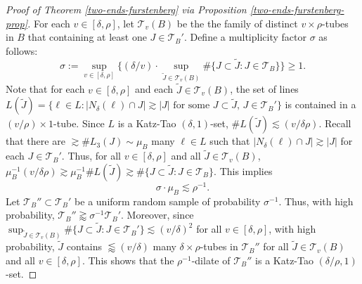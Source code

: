 \documentclass{amsart}
\numberwithin{equation}{section}
\newcommand{\de}{\delta}
\newcommand{\si}{\sigma}
\newcommand{\cT}{{\mathcal T}}
\begin{document}
\begin{proof}[Proof of Theorem \ref{two-ends-furstenberg} via Proposition \ref{two-ends-furstenberg-prop}]
For each $v\in[\de,\rho]$, let $\cT_v(B)$ be  the the family of distinct $v\times\rho$-tubes in $B$ that containing at least one $J\in\cT_B'$.
Define a multiplicity factor $\si$ as follows:
\begin{equation}
    \si:=\sup_{v\in[\de,\rho]} \{ (\de/v)\cdot\sup_{\tilde{J}\in\cT_v(B)}\#\{J\subset \tilde{J}: J\in\cT_B\} \} \geq1.
\end{equation}
Note that for each $v\in[\de,\rho]$ and each $\tilde{J}\in\cT_v(B)$, the set of lines $L(\tilde{J})=\{\ell\in L:|N_\delta(\ell)\cap J| \gtrsim |J|\text{ for some }J\subset \tilde{J},\,J\in\cT_B'\}$ is contained in a $  (v/\rho)\times 1$-tube.
Since $L$ is a Katz-Tao $(\de,1)$-set, $\# L(\tilde{J})\lesssim (v/\de \rho)$.
Recall that there are $\gtrsim\#L_3(J)\sim\mu_B$ many $\ell\in L$ such that $|N_\delta(\ell)\cap J| \gtrsim |J|$ for each $J\in\cT_B'$.
Thus, for all $v\in[\de,\rho]$ and all $\tilde{J}\in\cT_v(B)$, $\mu_B^{-1}(v/\de \rho)\gtrsim\mu_B^{-1}\#L(\tilde{J})\gtrsim\#\{J\subset \tilde{J}: J\in\cT_B\}$. 
This implies
\begin{equation}
\label{si-mu-B}
    \si \cdot \mu_B\lesssim \rho^{-1}.  
\end{equation}
Let $\cT_B''\subset\cT_B'$ be a uniform random sample of probability $\si^{-1}$.
Thus, with high probability, $\cT_B''\gtrapprox \si^{-1}\cT_B'$.
Moreover, since $\sup_{\tilde{J}\in\cT_v(B)}\#\{J\subset \tilde{J}: J\in\cT_B'\}\lesssim(v/\de)^2$  for all $v\in[\de,\rho]$, with high probability, $\tilde{J}$ contains $\lessapprox(v/\de)$ many $\de\times \rho$-tubes in $\cT_B''$ for all $\tilde{J}\in\cT_v(B)$ and all $v\in[\de,\rho]$.
This shows that the $\rho^{-1}$-dilate of $\cT_B''$ is a Katz-Tao $(\de/\rho,1)$-set.

\smallskip


\end{proof}
\end{document}
